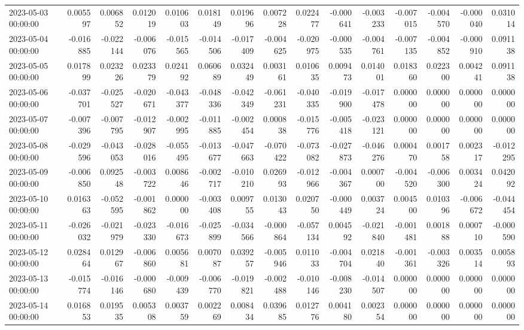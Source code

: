 \begin{tabular}{lrrrrrrrrrrrrrr}
2023-05-03 00:00:00 & 0.005597 & 0.006852 & 0.012019 & 0.010603 & 0.018149 & 0.019696 & 0.007228 & 0.022477 & -0.000641 & -0.003233 & -0.007015 & -0.004570 & -0.000040 & 0.031014 \\
2023-05-04 00:00:00 & -0.016885 & -0.022144 & -0.006076 & -0.015565 & -0.014506 & -0.017409 & -0.004625 & -0.020975 & -0.000535 & -0.004761 & -0.007135 & -0.004852 & -0.000910 & 0.091138 \\
2023-05-05 00:00:00 & 0.017899 & 0.023226 & 0.023379 & 0.024192 & 0.060689 & 0.032449 & 0.003161 & 0.010635 & 0.009473 & 0.014001 & 0.018360 & 0.022300 & 0.004241 & 0.091138 \\
2023-05-06 00:00:00 & -0.037701 & -0.025527 & -0.020671 & -0.043377 & -0.048336 & -0.042349 & -0.061231 & -0.040335 & -0.019900 & -0.017478 & 0.000000 & 0.000000 & 0.000000 & 0.000000 \\
2023-05-07 00:00:00 & -0.007396 & -0.007795 & -0.012907 & -0.002995 & -0.011885 & -0.002454 & 0.000838 & -0.015776 & -0.005418 & -0.023121 & 0.000000 & 0.000000 & 0.000000 & 0.000000 \\
2023-05-08 00:00:00 & -0.029596 & -0.043053 & -0.028016 & -0.055495 & -0.013677 & -0.047663 & -0.070422 & -0.073082 & -0.027873 & -0.046276 & 0.000470 & 0.001758 & 0.002317 & -0.012295 \\
2023-05-09 00:00:00 & -0.006850 & 0.092548 & -0.003722 & 0.008646 & -0.002717 & -0.010210 & 0.026993 & -0.012966 & -0.004367 & 0.000700 & -0.004520 & -0.006300 & 0.003424 & 0.042092 \\
2023-05-10 00:00:00 & 0.016363 & -0.052595 & -0.001862 & 0.000000 & -0.003408 & 0.009755 & 0.013043 & 0.020750 & -0.000449 & 0.003724 & 0.004500 & 0.010396 & -0.006672 & -0.044454 \\
2023-05-11 00:00:00 & -0.026032 & -0.021979 & -0.023330 & -0.016673 & -0.025899 & -0.034566 & -0.000864 & -0.057134 & 0.004592 & -0.021840 & -0.001481 & 0.001888 & 0.000710 & -0.000590 \\
2023-05-12 00:00:00 & 0.028464 & 0.012967 & -0.006860 & 0.005681 & 0.007087 & 0.039257 & -0.005946 & 0.011033 & -0.004704 & 0.021840 & -0.001361 & -0.003326 & 0.003514 & 0.005893 \\
2023-05-13 00:00:00 & -0.015774 & -0.016146 & -0.000680 & -0.009439 & -0.006770 & -0.019821 & -0.002488 & -0.010146 & -0.008230 & -0.014507 & 0.000000 & 0.000000 & 0.000000 & 0.000000 \\
2023-05-14 00:00:00 & 0.016853 & 0.019535 & 0.005308 & 0.003759 & 0.002269 & 0.008434 & 0.039685 & 0.012776 & 0.004180 & 0.002354 & 0.000000 & 0.000000 & 0.000000 & 0.000000 \\

\end{tabular}
